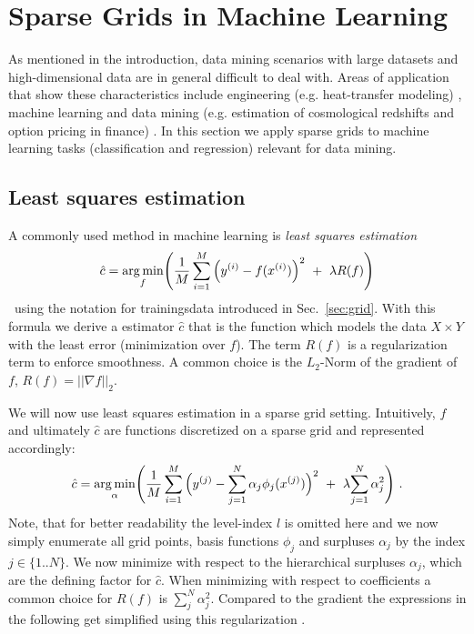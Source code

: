 \section{Sparse Grids in Machine Learning}

As mentioned in the introduction, data mining scenarios with large datasets
and high-dimensional data are in general difficult to deal with.
Areas of application
that show these characteristics include engineering (e.g. heat-transfer
modeling) \cite{disspeh},
machine learning and data mining (e.g. estimation of cosmological redshifts
and option pricing in finance) \cite{disspfl}. In this section
we apply sparse grids to machine learning tasks
(classification and regression) relevant for data mining.
\par
\subsection{Least squares estimation}
A commonly used method in machine learning is \emph{least squares estimation}
$$\hat{c} = \underset{f}{\text{arg \hspace{-0.5mm}min}}\Bigg(\frac{1}{M}\sum\limits_{i = 1}^{M}{\Big(y^{(i)} - f(x^{(i)})\Big)^2 \ + \ \lambda R(f)} \Bigg)$$ \
using the notation for trainingsdata 
introduced in Sec.~\ref{sec:grid}. With this formula we
derive a estimator $\hat{c}$ that is the function which models the
data $X \times Y$ with the least error (minimization over $f$).
The term $R(f)$ is a regularization term to enforce smoothness. A common choice
is the $L_2$-Norm of the gradient of $f$, $R(f) = ||\nabla f||_2$.
\par
We will now use least squares estimation in a sparse grid setting. Intuitively,
$f$ and ultimately $\hat{c}$
 are functions discretized on a sparse grid and represented
accordingly:
$$\hat{c} = \underset{{\alpha}}{\text{arg \hspace{-0.5mm}min}}\Bigg(\frac{1}{M}
\sum\limits_{i = 1}^{M}{\Big(y^{(j)} - {\sum_{j=1}^N{\alpha_j}\phi_j(x^{(j)})}\Big)^2 \ + \
  \lambda {\sum_{j=1}^N{\alpha_j^2}}}\color{black} \Bigg) \ .$$
Note, that for better readability the level-index $l$ is omitted here and
we now simply enumerate all grid points, basis functions $\phi_j$ and surpluses
$\alpha_j$
 by the index $j \in \{1..N\}$.
We now minimize with respect to the hierarchical surpluses $\alpha_j$,
which are the defining factor for $\hat{c}$.
When minimizing with respect to coefficients a common choice for
$R(f)$ is $\sum_j^N{\alpha_j^2}$. Compared to the gradient the
expressions in the following get simplified using this regularization
\cite{disspfl}.

